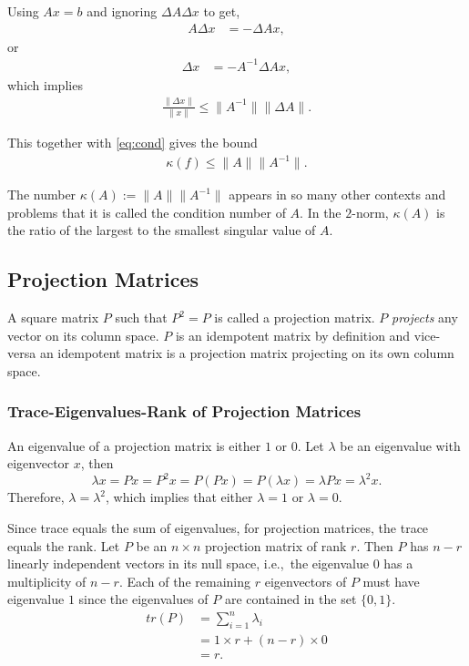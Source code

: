 \documentclass{amsart}
\theoremstyle{plain}
\numberwithin{equation}{section}
\begin{document}
Using $Ax=b$ and ignoring $\Delta A \Delta x$ to get,
\begin{align*}
A \Delta x  &= - \Delta A x,
\end{align*}
or
\begin{align*}
\Delta x &= - A^{-1} \Delta A x,
\end{align*}
which implies
\begin{align*}
\frac{\| \Delta x \|}{\| x \|} \leq \| A^{-1} \| \| \Delta A \| .
\end{align*}

This together with \eqref{eq:cond} gives the bound
\begin{align*}
\kappa(f) \leq \|A\| \|A^{-1}\|.
\end{align*}

The number $\kappa(A) := \|A\| \|A^{-1}\|$ appears in so many other 
contexts and problems that it is called the condition number of $A$.
In the $2$-norm, $\kappa(A)$ is the ratio of the largest to the smallest
singular value of $A$.

\subsection*{Projection Matrices}
A square matrix $P$ such that $P^2=P$ is called
a projection matrix. $P$ \emph{projects} any 
vector on its column space. $P$ is an idempotent
matrix by definition and vice-versa an 
idempotent matrix is a projection matrix
projecting on its own column space.

\subsubsection*{Trace-Eigenvalues-Rank of Projection Matrices}
An eigenvalue of a projection matrix is 
either $1$ or $0$. Let $\lambda$ be an eigenvalue
with eigenvector $x$, then
\begin{equation}
\lambda x = P x= P^2x = P (Px) = P(\lambda x) = \lambda P x = \lambda^2 x.
\end{equation}
Therefore, $\lambda = \lambda^2$, which implies that either $\lambda = 1$ or 
$\lambda = 0$. 

Since trace equals the sum of eigenvalues, for projection matrices, the trace equals
the rank. Let $P$ be an $n \times n$ projection matrix of rank $r$. Then
$P$ has $n-r$ linearly independent vectors in its null space, i.e.,\
the eigenvalue $0$ has a multiplicity of $n-r$. Each of the remaining
$r$ eigenvectors of $P$ must have eigenvalue $1$ since the eigenvalues 
of $P$ are contained in the set $\{0, 1\}$. 
\begin{align*}
tr(P) &= \sum_{i=1}^n \lambda_i \\
&= 1 \times r  + (n-r) \times 0 \\
&= r.
\end{align*}
\end{document}

